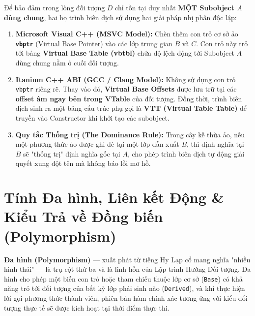 \documentclass[12pt,a4paper,oneside]{book}
\begin{document}
\begin{underhoodbox}
Để bảo đảm trong lòng đối tượng $D$ chỉ tồn tại duy nhất \textbf{MỘT Subobject $A$ dùng chung}, hai họ trình biên dịch sử dụng hai giải pháp nhị phân độc lập:
\begin{enumerate}
    \item \textbf{Microsoft Visual C++ (MSVC Model):} Chèn thêm con trỏ cơ sở ảo \textbf{\texttt{vbptr}} (Virtual Base Pointer) vào các lớp trung gian $B$ và $C$. Con trỏ này trỏ tới bảng \textbf{Virtual Base Table (vbtbl)} chứa độ lệch động tới Subobject $A$ dùng chung nằm ở cuối đối tượng.
    \item \textbf{Itanium C++ ABI (GCC / Clang Model):} Không sử dụng con trỏ \texttt{vbptr} riêng rẽ. Thay vào đó, \textbf{Virtual Base Offsets} được lưu trữ tại các \textbf{offset âm ngay bên trong VTable} của đối tượng. Đồng thời, trình biên dịch sinh ra một bảng cấu trúc phụ gọi là \textbf{VTT (Virtual Table Table)} để truyền vào Constructor khi khởi tạo các subobject.
    \item \textbf{Quy tắc Thống trị (The Dominance Rule):} Trong cây kế thừa ảo, nếu một phương thức ảo được ghi đè tại một lớp dẫn xuất $B$, thì định nghĩa tại $B$ sẽ "thống trị" định nghĩa gốc tại $A$, cho phép trình biên dịch tự động giải quyết xung đột tên mà không báo lỗi mơ hồ.
\end{enumerate}
\end{underhoodbox}

\chapter{Tính Đa hình, Liên kết Động \& Kiểu Trả về Đồng biến (Polymorphism)}

\begin{theorybox}
\textbf{Đa hình (Polymorphism)} --- xuất phát từ tiếng Hy Lạp cổ mang nghĩa "nhiều hình thái" --- là trụ cột thứ ba và là linh hồn của Lập trình Hướng Đối tượng. Đa hình cho phép một biến con trỏ hoặc tham chiếu thuộc lớp cơ sở (\texttt{Base}) có khả năng trỏ tới đối tượng của bất kỳ lớp phái sinh nào (\texttt{Derived}), và khi thực hiện lời gọi phương thức thành viên, phiên bản hàm chính xác tương ứng với kiểu đối tượng thực tế sẽ được kích hoạt tại thời điểm thực thi.
\end{theorybox}
\end{document}
